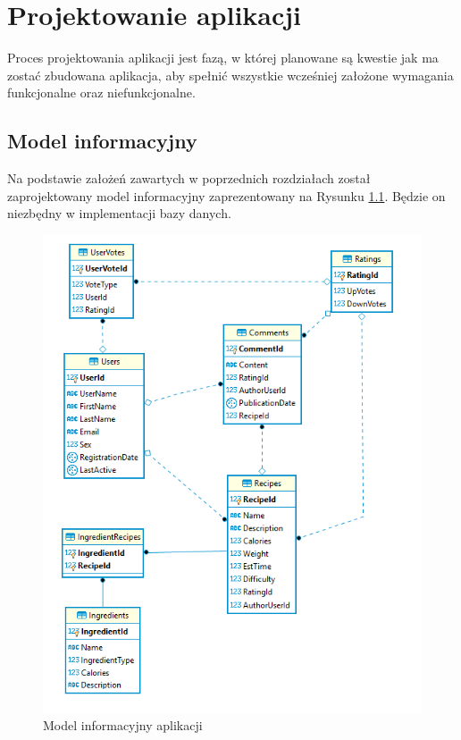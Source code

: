 \chapter{Projektowanie aplikacji}
Proces projektowania aplikacji jest fazą, w której planowane są kwestie jak ma zostać zbudowana aplikacja, aby spełnić wszystkie wcześniej założone wymagania funkcjonalne oraz niefunkcjonalne. 

\section{Model informacyjny}
Na podstawie założeń zawartych w poprzednich rozdziałach został zaprojektowany model informacyjny zaprezentowany na Rysunku \ref{fig:db}. Będzie on niezbędny w implementacji bazy danych.

\begin{figure}[H]
\includegraphics[width=\textwidth]{rys/db.png}
\caption{Model informacyjny aplikacji}
\label{fig:db}
\end{figure}

